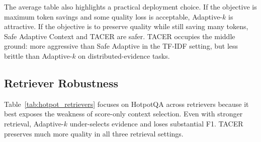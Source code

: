 \documentclass[11pt]{article}
\begin{document}
The average table also highlights a practical deployment choice. If the objective is maximum token savings and some quality loss is acceptable, Adaptive-$k$ is attractive. If the objective is to preserve quality while still saving many tokens, Safe Adaptive Context and TACER are safer. TACER occupies the middle ground: more aggressive than Safe Adaptive in the TF-IDF setting, but less brittle than Adaptive-$k$ on distributed-evidence tasks.

\begin{table}[t]
\centering
\small
\caption{Average behavior across five datasets. Retention is relative to Fixed Top-10 under the same retriever.}
\label{tab:averages}
\end{table}

\subsection{Retriever Robustness}

Table~\ref{tab:hotpot_retrievers} focuses on HotpotQA across retrievers because it best exposes the weakness of score-only context selection. Even with stronger retrieval, Adaptive-$k$ under-selects evidence and loses substantial F1. TACER preserves much more quality in all three retrieval settings.
\end{document}
